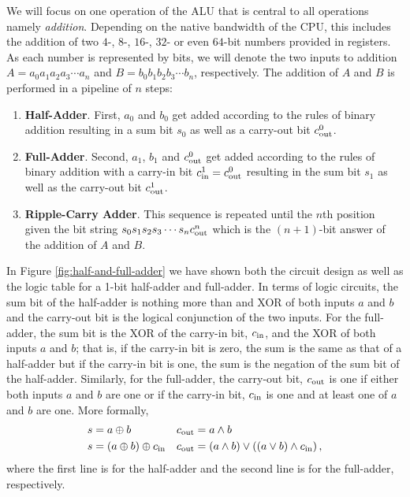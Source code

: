 We will focus on one operation of the ALU that is central to all operations namely {\em addition}. Depending on the native bandwidth of the CPU, this includes the addition of two $4$-, $8$-, $16$-, $32$- or even $64$-bit numbers provided in registers. As each number is represented by bits, we will denote the two inputs to addition $A=a_0a_1a_2a_3\cdots a_n$ and $B=b_0b_1b_2b_3\cdots b_n$, respectively. The addition of $A$ and $B$ is performed in a pipeline of $n$ steps:
\begin{enumerate}
    \item {\bf Half-Adder}. First, $a_0$ and $b_0$ get added according to the rules of binary addition resulting in a sum bit $s_0$ as well as a carry-out bit $c_{\mathrm{out}}^0$.
    \item {\bf Full-Adder}. Second, $a_1$, $b_1$ and $c_{\mathrm{out}}^0$ get added according to the rules of binary addition with a carry-in bit $c_{\mathrm{in}}^1=c_{\mathrm{out}}^0$ resulting in the sum bit $s_1$ as well as the carry-out bit $c_{\mathrm{out}}^1$.
    \item {\bf Ripple-Carry Adder}. This sequence is repeated until the $n$th position given the bit string $s_0s_1s_2s_3\cdots s_nc_{\mathrm{out}}^n$ which is the $(n+1)$-bit answer of the addition of $A$ and $B$.
\end{enumerate}

In Figure \ref{fig:half-and-full-adder} we have shown both the circuit design as well as the logic table for a 1-bit half-adder and full-adder. In terms of logic circuits, the sum bit of the half-adder is nothing more than and XOR of both inputs $a$ and $b$ and the carry-out bit is the logical conjunction of the two inputs. For the full-adder, the sum bit is the XOR of the carry-in bit, $c_{\mathrm{in}}$, and the XOR of both inputs $a$ and $b$; that is, if the carry-in bit is zero, the sum is the same as that of a half-adder but if the carry-in bit is one, the sum is the negation of the sum bit of the half-adder. Similarly, for the full-adder, the carry-out bit, $c_{\mathrm{out}}$ is one if either both inputs $a$ and $b$ are one or if the carry-in bit, $c_{\mathrm{in}}$ is one and at least one of $a$ and $b$ are one. More formally,
\begin{align}
    s & = a \oplus b & c_{\mathrm{out}} & = a \land b \\
    s & = (a \oplus b) \oplus c_{\mathrm{in}} & c_{\mathrm{out}} & = (a \land b) \lor ((a \lor b) \land c_{\mathrm{in}}) \label{eq:full_adder_logic} \,,
\end{align}
where the first line is for the half-adder and the second line is for the full-adder, respectively.


